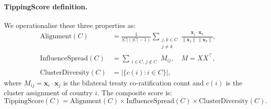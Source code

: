 \documentclass[11pt]{article}
\begin{document}
\paragraph{TippingScore definition.}
We operationalise these three properties as:
\begin{align}
    \text{Alignment}(C) &= \frac{1}{|C|(|C|-1)} \sum_{\substack{j,k \in C \\ j \neq k}} \frac{\mathbf{x}_j \cdot \mathbf{x}_k}{\|\mathbf{x}_j\|\,\|\mathbf{x}_k\|}, \label{eq:alignment} \\
    \text{InfluenceSpread}(C) &= \sum_{\substack{i \in C,\, j \notin C}} M_{ij}, \quad M = XX^\top, \label{eq:spread} \\
    \text{ClusterDiversity}(C) &= \bigl|\{c(i) : i \in C\}\bigr|, \label{eq:diversity}
\end{align}
where $M_{ij} = \mathbf{x}_i \cdot \mathbf{x}_j$ is the bilateral treaty co-ratification count and $c(i)$ is the cluster assignment of country $i$. The composite score is:
\begin{equation}
    \text{TippingScore}(C) = \text{Alignment}(C) \times \text{InfluenceSpread}(C) \times \text{ClusterDiversity}(C).
    \label{eq:tipping_score}
\end{equation}
\end{document}
